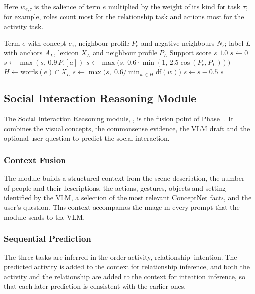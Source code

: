 Here $w_{e,\tau}$ is the salience of term $e$ multiplied by the weight of its kind for task $\tau$; for example, roles count most for the relationship task and actions most for the activity task.

\begin{algorithm}[H]
\caption{Support of One Evidence Term for One Label}
\label{alg:support}
\begin{algorithmic}[1]
\Require Term $e$ with concept $c_e$, neighbour profile $P_e$ and negative neighbours $N_e$; label $L$ with anchors $A_L$, lexicon $X_L$ and neighbour profile $P_L$
\Ensure Support score $s$
  \State \Return $1.0$ 
\EndIf
\State $s \gets 0$
    \State $s \gets \max(s,\, 0.9\, P_e[a])$ 
  \EndIf
\EndFor
\State $s \gets \max\big(s,\; 0.6 \cdot \min(1,\, 2.5 \cos(P_e, P_L))\big)$ 
\State $H \gets \mathrm{words}(e) \cap X_L$
  \State $s \gets \max\big(s,\; 0.6 / \min_{w \in H} \mathrm{df}(w)\big)$ 
\EndIf
{}
  \State $s \gets s - 0.5$ 
\EndIf
\State \Return $s$
\end{algorithmic}
\end{algorithm}

\subsection{Social Interaction Reasoning Module}
\label{sec:reasoning}

The Social Interaction Reasoning module, , is the fusion point of Phase I. It combines the visual concepts, the commonsense evidence, the VLM draft and the optional user question to predict the social interaction.

\subsubsection{Context Fusion}
The module builds a structured context from the scene description, the number of people and their descriptions, the actions, gestures, objects and setting identified by the VLM, a selection of the most relevant ConceptNet facts, and the user's question. This context accompanies the image in every prompt that the module sends to the VLM.

\subsubsection{Sequential Prediction}
The three tasks are inferred in the order activity, relationship, intention. The predicted activity is added to the context for relationship inference, and both the activity and the relationship are added to the context for intention inference, so that each later prediction is consistent with the earlier ones.

